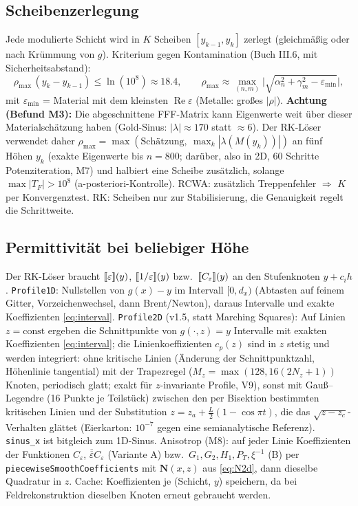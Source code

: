 \subsection{Scheibenzerlegung}
Jede modulierte Schicht wird in $K$ Scheiben $[y_{k-1},y_k]$ zerlegt (gleichmäßig oder nach Krümmung
von $g$). Kriterium gegen Kontamination (Buch III.6, mit Sicherheitsabstand):
\begin{equation}
  \rho_{\max}\,(y_k-y_{k-1})\le\ln(10^{8})\approx18.4,\qquad
  \rho_{\max}\approx\max_{(n,m)}\big|\sqrt{\alpha_n^2+\gamma_m^2-\varepsilon_{\min}}\big|,
  \label{eq:slicecrit}
\end{equation}
mit $\varepsilon_{\min}$ = Material mit dem kleinsten $\operatorname{Re}\varepsilon$ (Metalle: großes $|\rho|$).
\textbf{Achtung (Befund M3):} Die abgeschnittene FFF-Matrix kann Eigenwerte weit über dieser
Materialschätzung haben (Gold-Sinus: $|\lambda|\approx170$ statt $\approx6$). Der RK-Löser verwendet daher
$\rho_{\max}=\max(\text{Schätzung},\ \max_k|\lambda(M(y_k))|)$ an fünf Höhen $y_k$ (exakte Eigenwerte bis $n=800$; darüber, also in 2D, 60 Schritte Potenziteration, M7) und halbiert eine Scheibe
zusätzlich, solange $\max|T_F|>10^{8}$ (a-posteriori-Kontrolle).
RCWA: zusätzlich Treppenfehler $\Rightarrow$ $K$ per Konvergenztest. RK: Scheiben nur zur Stabilisierung,
die Genauigkeit regelt die Schrittweite.

\subsection{Permittivität bei beliebiger Höhe}
Der RK-Löser braucht $[\![\varepsilon]\!](y)$, $[\![1/\varepsilon]\!](y)$ bzw.\ $[\![C_\varepsilon]\!](y)$ an den
Stufenknoten $y+c_ih$. \verb|Profile1D|: Nullstellen von $g(x)-y$ im Intervall $[0,d_x)$ (Abtasten auf
feinem Gitter, Vorzeichenwechsel, dann Brent/Newton), daraus Intervalle und exakte Koeffizienten
\eqref{eq:interval}. \verb|Profile2D| (v1.5, statt Marching Squares): Auf Linien $z=\text{const}$ ergeben die Schnittpunkte von
$g(\cdot,z)=y$ Intervalle mit exakten Koeffizienten \eqref{eq:interval}; die Linienkoeffizienten $c_p(z)$ sind in $z$
stetig und werden integriert: ohne kritische Linien (Änderung der Schnittpunktzahl, Höhenlinie tangential) mit der
Trapezregel ($M_z=\max(128,16(2N_z+1))$ Knoten, periodisch glatt; exakt für $z$-invariante Profile, V9), sonst
mit Gauß--Legendre (16 Punkte je Teilstück) zwischen den per Bisektion bestimmten kritischen Linien und der
Substitution $z=z_a+\tfrac L2(1-\cos\pi t)$, die das $\sqrt{z-z_c}$-Verhalten glättet (Eierkarton: $10^{-7}$
gegen eine semianalytische Referenz). \verb|sinus_x| ist bitgleich zum 1D-Sinus.
Anisotrop (M8): auf jeder Linie Koeffizienten der Funktionen $C_\varepsilon$, $\overline{\overline\varepsilon}C_\varepsilon$
(Variante A) bzw.\ $G_1,G_2,H_1,P_T,\xi^{-1}$ (B) per \verb|piecewiseSmoothCoefficients| mit $\mathbf N(x,z)$ aus
\eqref{eq:N2d}, dann dieselbe Quadratur in $z$. Cache: Koeffizienten je (Schicht, $y$) speichern, da
bei Feldrekonstruktion dieselben Knoten erneut gebraucht werden.

